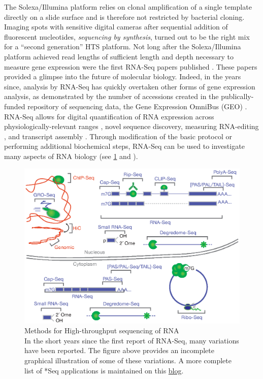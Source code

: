     The Solexa/Illumina platform relies on clonal amplification of a single template directly on a slide surface and is therefore not restricted by bacterial cloning. Imaging spots with sensitive digital cameras after sequential addition of fluorescent nucleotides, \textit{sequencing by synthesis}, turned out to be the right mix for a ``second generation'' HTS platform. Not long after the Solexa/Illumina platform achieved read lengths of sufficient length and depth necessary to measure gene expression were the first RNA-Seq papers published \citep{Mortazavi2008, Nagalakshmi2008,Lister2008}. These papers provided a glimpse into the future of molecular biology. Indeed, in the years since, analysis by RNA-Seq has quickly overtaken other forms of gene expression analysis, as demonstrated by the number of accessions created in the publically-funded repository of sequencing data, the Gene Expression OmniBus (GEO) \citep{Barrett2013}. RNA-Seq allows for digital quantification of RNA expression across physiologically-relevant ranges \citep{Blencowe2009}, novel sequence discovery, measuring RNA-editing \citep{Li2011}, and transcript assembly \citep{Trapnell2010}. Through modification of the basic protocol or performing additional biochemical steps, RNA-Seq can be used to investigate many aspects of RNA biology (see \ref{Intro:fig:htsMethods} and \citep{Mutz2013}).

    \begin{figure} %
      \centering 
      \includegraphics{Figures/Intro/RNA_Sequencing_methodologies.eps}
      \caption[Methods for High-throughput sequencing of RNA]
      {
      Methods for High-throughput sequencing of RNA\\[0.25cm]
      In the short years since the first report of RNA-Seq, many variations have been reported. The figure above provides an incomplete graphical illustration of some of these variations. A more complete list of *Seq applications is maintained on this \href{http://liorpachter.wordpress.com/seq/}{blog}.
      }
      \label{Intro:fig:htsMethods}
      \end{figure}

